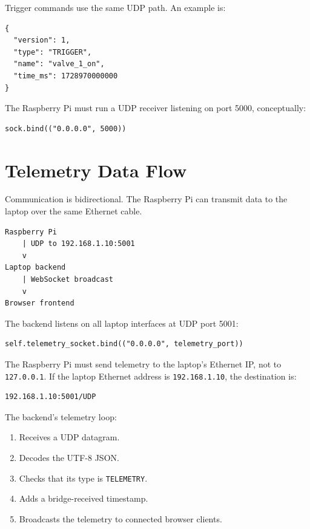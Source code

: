 \documentclass[11pt]{article}
\begin{document}
Trigger commands use the same UDP path. An example is:

\begin{lstlisting}
{
  "version": 1,
  "type": "TRIGGER",
  "name": "valve_1_on",
  "time_ms": 1728970000000
}
\end{lstlisting}

The Raspberry Pi must run a UDP receiver listening on port 5000, conceptually:

\begin{lstlisting}
sock.bind(("0.0.0.0", 5000))
\end{lstlisting}

\section{Telemetry Data Flow}

Communication is bidirectional. The Raspberry Pi can transmit data to the
laptop over the same Ethernet cable.

\begin{lstlisting}
Raspberry Pi
    | UDP to 192.168.1.10:5001
    v
Laptop backend
    | WebSocket broadcast
    v
Browser frontend
\end{lstlisting}

The backend listens on all laptop interfaces at UDP port 5001:

\begin{lstlisting}
self.telemetry_socket.bind(("0.0.0.0", telemetry_port))
\end{lstlisting}

The Raspberry Pi must send telemetry to the laptop's Ethernet IP, not to
\texttt{127.0.0.1}. If the laptop Ethernet address is
\texttt{192.168.1.10}, the destination is:

\begin{lstlisting}
192.168.1.10:5001/UDP
\end{lstlisting}

The backend's telemetry loop:

\begin{enumerate}[leftmargin=*]
    \item Receives a UDP datagram.
    \item Decodes the UTF-8 JSON.
    \item Checks that its type is \texttt{TELEMETRY}.
    \item Adds a bridge-received timestamp.
    \item Broadcasts the telemetry to connected browser clients.
\end{enumerate}
\end{document}
